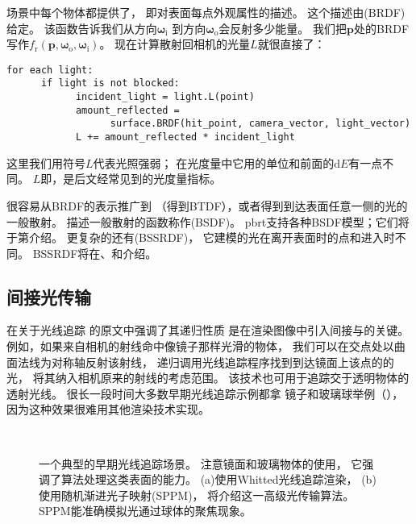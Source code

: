 场景中每个物体都提供了，
即对表面每点外观属性的描述。
这个描述由(BRDF)给定。
该函数告诉我们从方向${\bm \omega}_\mathrm{i}$
到方向${\bm \omega}_\mathrm{o}$会反射多少能量。
我们把$\bm p$处的BRDF写作$f_{\mathrm{r}}({\bm p},{\bm \omega}_\mathrm{o},{\bm \omega}_\mathrm{i})$。
现在计算散射回相机的光量$L$就很直接了：
\begin{lstlisting}
for each light:
      if light is not blocked:
            incident_light = light.L(point)
            amount_reflected =
                  surface.BRDF(hit_point, camera_vector, light_vector)
            L += amount_reflected * incident_light
\end{lstlisting}
这里我们用符号$L$代表光照强弱；
在光度量中它用的单位和前面的$\mathrm{d}E$有一点不同。
$L$即，是后文经常见到的光度量指标。

很容易从BRDF的表示推广到
（得到BTDF），或者得到到达表面任意一侧的光的一般散射。
描述一般散射的函数称作(BSDF)。
pbrt支持各种BSDF模型；它们将于第介绍。
更复杂的还有(BSSRDF)，
它建模的光在离开表面时的点和进入时不同。
BSSRDF将在、和介绍。

\subsection{间接光传输}\label{sub:间接光传输}

\citet{10.1145/358876.358882}在关于光线追踪
的原文中强调了其递归性质
是在渲染图像中引入间接与的关键。
例如，如果来自相机的射线命中像镜子那样光滑的物体，
我们可以在交点处以曲面法线为对称轴反射该射线，
递归调用光线追踪程序找到到达镜面上该点的的光，
将其纳入相机原来的射线的考虑范围。
该技术也可用于追踪交于透明物体的透射光线。
很长一段时间大多数早期光线追踪示例都拿
镜子和玻璃球举例（），
因为这种效果很难用其他渲染技术实现。
\begin{figure}[htbp]
      \centering
      \\
      \caption{一个典型的早期光线追踪场景。
            注意镜面和玻璃物体的使用，
            它强调了算法处理这类表面的能力。
            (a)使用Whitted光线追踪渲染，
            (b)使用随机渐进光子映射(SPPM)，
            将介绍这一高级光传输算法。
            SPPM能准确模拟光通过球体的聚焦现象。}\label{fig:1.7}
\end{figure}

